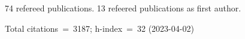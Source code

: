 74 refereed publications. 13 refeered publications as first author.

Total citations~=~3187; h-index~=~32 (2023-04-02)